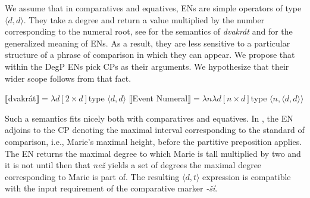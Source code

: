\documentclass[output=paper,modfonts,hidelinks,newtxmath
\ChapterDOI{10.5281/zenodo.2545513}
]{langscibook}
\begin{document}
\noindent We assume that in comparatives and equatives, ENs are simple operators of type $\langle d,d\rangle$. They take a degree and return a value multiplied by the number corresponding to the numeral root, see  for the semantics of \textit{dvakrát} and  for the generalized meaning of ENs. As a result, they are less sensitive to a particular structure of a phrase of comparison in which they can appear. We propose that within the DegP ENs pick CPs as their arguments. We hypothesize that their wider scope follows from that fact.

\ea \ea $\llbracket$dvakrát$\rrbracket = \lambda d[2 \times d]$\hfill type $\langle d,d\rangle$\label{event-num-semantics-dvakrat}
\ex $\llbracket$Event Numeral$\rrbracket = \lambda n\lambda d[n \times d]$\hfill type $\langle n,\langle d,d\rangle\rangle$\label{event-num-semantics-abstract}
\z \z

\noindent Such a semantics fits nicely both with comparatives and equatives. In , the EN adjoins to the CP denoting the maximal interval corresponding to the standard of comparison, i.e., Marie's maximal height, before the partitive preposition applies. The EN returns the maximal degree to which Marie is tall multiplied by two and it is not until then that \textit{než} yields a set of degrees the maximal degree corresponding to Marie is part of. The resulting $\langle d,t\rangle$ expression is compatible with the input requirement of the comparative marker \textit{-ší}. 

\begin{exe} \ex \label{tree-comp-dvakrat} 
\end{exe}
\end{document}
